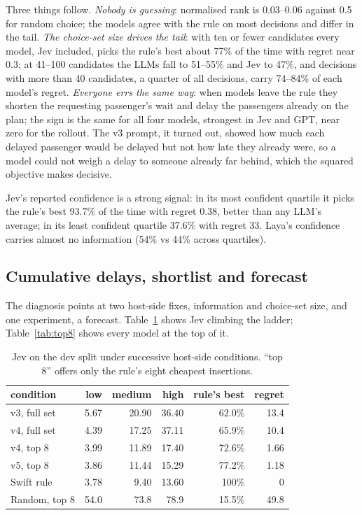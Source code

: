\documentclass[11pt]{article}
\begin{document}
Three things follow. \emph{Nobody is guessing}: normalised rank is 0.03--0.06 against 0.5 for random choice; the models agree with the rule on most decisions and differ in the tail. \emph{The choice-set size drives the tail}: with ten or fewer candidates every model, Jev included, picks the rule's best about 77\% of the time with regret near 0.3; at 41--100 candidates the LLMs fall to 51--55\% and Jev to 47\%, and decisions with more than 40 candidates, a quarter of all decisions, carry 74--84\% of each model's regret. \emph{Everyone errs the same way}: when models leave the rule they shorten the requesting passenger's wait and delay the passengers already on the plan; the sign is the same for all four models, strongest in Jev and GPT, near zero for the rollout. The v3 prompt, it turned out, showed how much each delayed passenger would be delayed but not how late they already were, so a model could not weigh a delay to someone already far behind, which the squared objective makes decisive.

Jev's reported confidence is a strong signal: in its most confident quartile it picks the rule's best 93.7\% of the time with regret 0.38, better than any LLM's average; in its least confident quartile 37.6\% with regret 33. Laya's confidence carries almost no information (54\% vs 44\% across quartiles).

\subsection{Cumulative delays, shortlist and forecast}
\label{sec:ladder}
The diagnosis points at two host-side fixes, information and choice-set size, and one experiment, a forecast. Table~\ref{tab:ladder} shows Jev climbing the ladder; Table~\ref{tab:top8} shows every model at the top of it.

\begin{table}[t]
\centering
\caption{Jev on the dev split under successive host-side conditions. ``top 8'' offers only the rule's eight cheapest insertions.}
\label{tab:ladder}
\begin{tabular}{lrrrrr}
\toprule
condition & low & medium & high & rule's best & regret \\
\midrule
v3, full set & 5.67 & 20.90 & 36.40 & 62.0\% & 13.4 \\
v4, full set & 4.39 & 17.25 & 37.11 & 65.9\% & 10.4 \\
v4, top 8 & 3.99 & 11.89 & 17.40 & 72.6\% & 1.66 \\
v5, top 8 & 3.86 & 11.44 & 15.29 & 77.2\% & 1.18 \\
\midrule
Swift rule & 3.78 & 9.40 & 13.60 & 100\% & 0 \\
Random, top 8 & 54.0 & 73.8 & 78.9 & 15.5\% & 49.8 \\
\bottomrule
\end{tabular}
\end{table}
\end{document}
